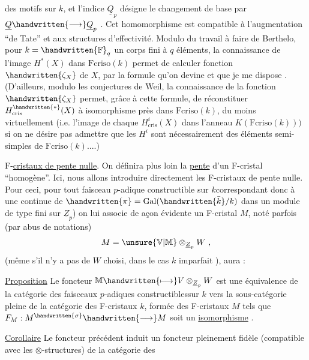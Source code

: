 
des motifs  sur $k$, et l'indice $\underline{Q}_p$ désigne le  changement de base par $\underline{Q}\handwritten{\longrightarrow}\underline{Q}_p$ . Cet homomorphisme est compatible à l'augmentation ``de Tate'' et aux structures d'effectivité. Modulo du travail à faire de Berthelo, pour $k=\handwritten{\mathbb{F}}_q$ un corps fini à $q$ éléments, la connaissance de l'image  $H^*(X)$ dans $\mathrm{Fcriso}(k)$ permet de calculer  fonction $\handwritten{\zeta_X}$ de $X$, par la formule qu'on devine et que je me dispose . (D'ailleurs, modulo les conjectures de Weil, la connaissance de la fonction $\handwritten{\zeta_X}$ permet, grâce à cette formule, de réconstituer $H^{\handwritten{*}}_{\mathrm{cris}}(X)$ à isomorphisme près dans $\mathrm{Fcriso}(k)$, du moins virtuellement (i.e. l'image de chaque $H^i_{\mathrm{cris}}(X)$ dans l'anneau $K(\mathrm{Fcriso}(k)))$ si on ne désire pas admettre que  les $H^i$ sont nécessairement des éléments semi-simples de $\mathrm{Fcriso}(k)$....)

 F-\uline{cristaux de  pente nulle}. On définira plus loin la \uline{pente} d'un F-cristal ``homogène''. Ici, nous allons introduire directement les F-cristaux de pente nulle. Pour ceci, pour tout faisceau $p$-adique constructible  sur $k$\handwritten{(}correspondant donc à une  continue de $\handwritten{\pi}=\operatorname{Gal}(\handwritten{\bar{k}}/k)$ dans un module de type fini sur $\underline{Z}_p$) on lui associe de açon évidente un F-cristal $M$, noté parfois (par abus de notations)
\[
M=\unsure{\mathbb{V}|\mathbb{M}}\otimes_{\underline{Z}_p}W\ ,
\]
(même s'il n'y a pas de $W$ choisi, dans le cas $k$ imparfait \handwritten{!} ),  aura :

\uline{Proposition} Le foncteur $\mathbb{M}\handwritten{\longmapsto}V\otimes_{\underline{Z}_p}W$ est une équivalence de la catégorie des faisceaux $p$-adiques constructibles\handwritten{\,}sur $k$ vers la sous-catégorie pleine de la catégorie des F-cristaux  $k$, formée des F-cristaux $M$ tels que $F_M : M^{\handwritten{\sigma}}\handwritten{\longrightarrow}M$ soit un \uline{isomorphisme} .

\uline{Corollaire} Le foncteur précédent induit un foncteur pleinement fidèle (compatible avec les $\otimes$-structures) de la catégorie des
